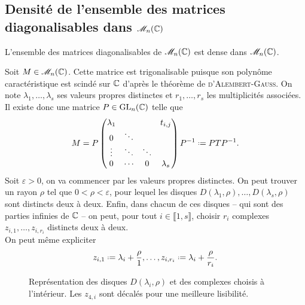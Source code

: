 \subsection{Densité de l'ensemble des matrices diagonalisables dans \texorpdfstring{$\mathscr{M}_n(\mathbb{C})$}{M_n(C)}}

\begin{theo}{}
    L'ensemble des matrices diagonalisables de $\mathscr{M}_n(\mathbb{C})$ est dense dans $\mathscr{M}_n(\mathbb{C})$.
\end{theo}

\begin{preuve}
    Soit $M \in \mathscr{M}_n(\mathbb{C})$. Cette matrice est trigonalisable puisque son polynôme caractéristique est scindé sur $\mathbb{C}$ d'après le théorème de \textsc{d'Alembert}-\textsc{Gauss}. On note $\lambda_1, \dots, \lambda_s$ ses valeurs propres distinctes et $r_1, \dots, r_s$ les multiplicités associées. Il existe donc une matrice $P \in \mathrm{GL}_n(\mathbb{C})$ telle que
    $$
    M = P
    \begin{pmatrix}
        \lambda_1 & & & t_{i,j} \\
        0 & \ddots & & \\
        \vdots & \ddots & \ddots & \\
        0 & \cdots & 0 & \lambda_s
    \end{pmatrix}
    \Inv{P} \defeq P T \Inv{P}.
    $$
    Soit $\varepsilon > 0$, on va commencer par  les valeurs propres distinctes. On peut trouver un rayon $\rho$ tel que $0 < \rho < \varepsilon$, pour lequel les disques $D(\lambda_1, \rho), \dots, D(\lambda_s, \rho)$ sont distincts deux à deux. Enfin, dans chacun de ces disques -- qui sont des parties infinies de $\mathbb{C}$ -- on peut, pour tout $i \in \llbracket 1, s \rrbracket$, choisir $r_i$ complexes $z_{i,1}, \dots, z_{i,r_i}$ distincts deux à deux. \\
    On peut même expliciter
    $$z_{i,1} \defeq \lambda_i + \frac{\rho}{1}, \dots, z_{i, r_i} \defeq \lambda_i + \frac{\rho}{r_i}.$$ 
    
    \begin{figure*}[h!]
        \centering
        
        \caption*{\centering Représentation des disques $D(\lambda_i, \rho)$ et des complexes choisis à l'intérieur. Les $z_{4, i}$ sont décalés pour une meilleure lisibilité.}
    \end{figure*}
    

\end{preuve}

